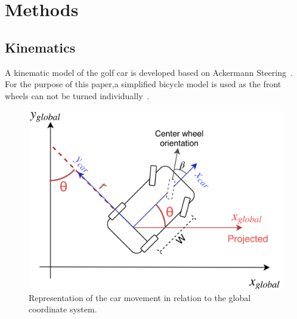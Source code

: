 
\section{Methods}\label{sec:Methods}

\subsection{Kinematics}\label{subsec:kinematics}

A kinematic model of the golf car is developed based on Ackermann Steering~\cite{VehicleDynamics}.
For the purpose of this paper,a simplified bicycle model is used as the front wheels can not be turned individually~\cite{VehicleDynamics}.

\begin{figure}[h]
    \centering
    \includegraphics[width = 0.8\columnwidth]{figures/OrientationCarWorldTest}
    \caption{Representation of the car movement in relation to the global coordinate system.}
    \label{fig:OrientationCarWorld}
\end{figure}